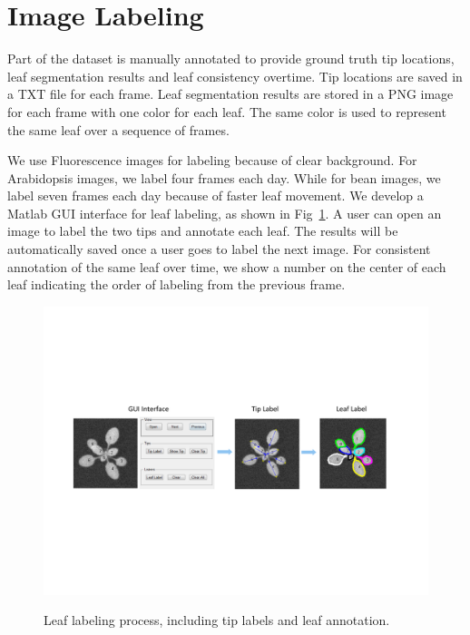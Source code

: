 \section{Image Labeling}

Part of the dataset is manually annotated to provide ground truth tip locations, leaf segmentation results and leaf consistency overtime.
Tip locations are saved in a TXT file for each frame.
Leaf segmentation results are stored in a PNG image for each frame with one color for each leaf.
The same color is used to represent the same leaf over a sequence of frames.

We use Fluorescence images for labeling because of clear background. 
For Arabidopsis images, we label four frames each day.
While for bean images, we label seven frames each day because of faster leaf movement.
We develop a Matlab GUI interface for leaf labeling, as shown in Fig~\ref{fig:label}.
A user can open an image to label the two tips and annotate each leaf.
The results will be automatically saved once a user goes to label the next image.
For consistent annotation of the same leaf over time, we show a number on the center of each leaf indicating the order of labeling from the previous frame. 

\begin{figure}[h]
\centering
\includegraphics[width=.98\textwidth]{Figures/labeling}\\
\caption{Leaf labeling process, including tip labels and leaf annotation.}
\label{fig:label}
\end{figure}


